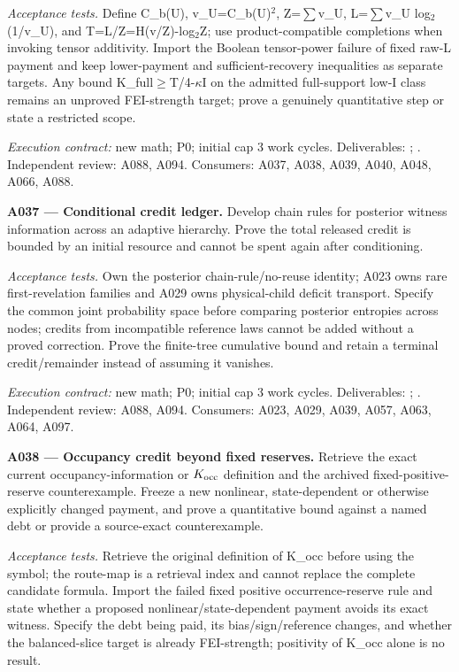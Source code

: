 \documentclass[11pt]{article}
\begin{document}
\emph{Acceptance tests.} Define C\_b(U), v\_U=C\_b(U)$^2$, Z=$\sum$v\_U, L=$\sum$v\_U log$_2$(1/v\_U), and T=L/Z=H(v/Z)-log$_2$Z; use product-compatible completions when invoking tensor additivity. Import the Boolean tensor-power failure of fixed raw-L payment and keep lower-payment and sufficient-recovery inequalities as separate targets. Any bound K\_full$\ge$T/4-$\kappa$I on the admitted full-support low-I class remains an unproved FEI-strength target; prove a genuinely quantitative step or state a restricted scope.

{\small\emph{Execution contract:} new math; P0; initial cap 3 work cycles. Deliverables: ; . Independent review: A088, A094. Consumers: A037, A038, A039, A040, A048, A066, A088.}

\textbf{A037 --- Conditional credit ledger.} Develop chain rules for posterior witness information across an adaptive hierarchy. Prove the total released credit is bounded by an initial resource and cannot be spent again after conditioning.

\emph{Acceptance tests.} Own the posterior chain-rule/no-reuse identity; A023 owns rare first-revelation families and A029 owns physical-child deficit transport. Specify the common joint probability space before comparing posterior entropies across nodes; credits from incompatible reference laws cannot be added without a proved correction. Prove the finite-tree cumulative bound and retain a terminal credit/remainder instead of assuming it vanishes.

{\small\emph{Execution contract:} new math; P0; initial cap 3 work cycles. Deliverables: ; . Independent review: A088, A094. Consumers: A023, A029, A039, A057, A063, A064, A097.}

\textbf{A038 --- Occupancy credit beyond fixed reserves.} Retrieve the exact current occupancy-information or $K_{\rm occ}$ definition and the archived fixed-positive-reserve counterexample. Freeze a new nonlinear, state-dependent or otherwise explicitly changed payment, and prove a quantitative bound against a named debt or provide a source-exact counterexample.

\emph{Acceptance tests.} Retrieve the original definition of K\_occ before using the symbol; the route-map is a retrieval index and cannot replace the complete candidate formula. Import the failed fixed positive occurrence-reserve rule and state whether a proposed nonlinear/state-dependent payment avoids its exact witness. Specify the debt being paid, its bias/sign/reference changes, and whether the balanced-slice target is already FEI-strength; positivity of K\_occ alone is no result.
\end{document}

